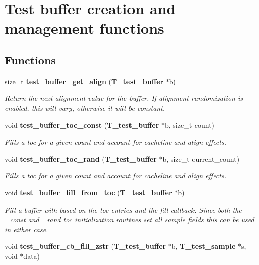 \section{Test buffer creation and management functions}
\label{group__test__buffer}
\subsection*{Functions}
\begin{CompactItemize}
\item 
size\_\-t {\bf test\_\-buffer\_\-get\_\-align} ({\bf T\_\-test\_\-buffer} $\ast$b)
\begin{CompactList}\small\item\em Return the next alignment value for the buffer. If alignment randomization is enabled, this will vary, otherwise it will be constant.\item\end{CompactList}\item 
void {\bf test\_\-buffer\_\-toc\_\-const} ({\bf T\_\-test\_\-buffer} $\ast$b, size\_\-t count)
\begin{CompactList}\small\item\em Fills a toc for a given count and account for cacheline and align effects.\item\end{CompactList}\item 
void {\bf test\_\-buffer\_\-toc\_\-rand} ({\bf T\_\-test\_\-buffer} $\ast$b, size\_\-t current\_\-count)
\begin{CompactList}\small\item\em Fills a toc for a given count and account for cacheline and align effects.\item\end{CompactList}\item 
void {\bf test\_\-buffer\_\-fill\_\-from\_\-toc} ({\bf T\_\-test\_\-buffer} $\ast$b)
\begin{CompactList}\small\item\em Fill a buffer with based on the toc entries and the fill callback. Since both the \_\-const and \_\-rand toc initialization routines set all sample fields this can be used in either case.\item\end{CompactList}\item 
void {\bf test\_\-buffer\_\-cb\_\-fill\_\-zstr} ({\bf T\_\-test\_\-buffer} $\ast$b, {\bf T\_\-test\_\-sample} $\ast$s, void $\ast$data)

\end{CompactItemize}
